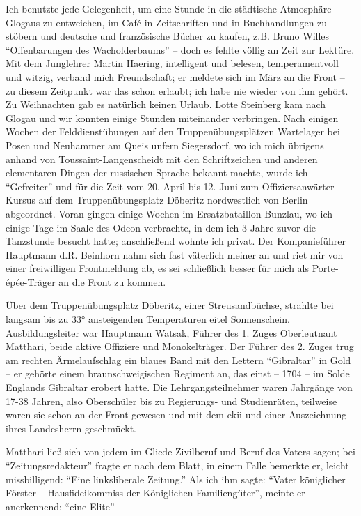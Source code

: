 \documentclass[a5paper,pagesize,10pt,twoside=true]{scrbook}
\begin{document}
Ich benutzte jede Gelegenheit, um eine Stunde in die städtische Atmosphäre Glogaus zu entweichen, im Café in Zeitschriften und in Buchhandlungen zu stöbern und deutsche und französische Bücher zu kaufen, z.B. Bruno Willes \enquote{Offenbarungen des Wacholderbaums} -- doch es fehlte völlig an Zeit zur Lektüre. Mit dem Junglehrer Martin Haering, intelligent und belesen, temperamentvoll und witzig, verband mich Freundschaft; er meldete sich im März an die Front -- zu diesem Zeitpunkt war das schon erlaubt; ich habe nie wieder von ihm gehört. Zu Weihnachten gab es natürlich keinen Urlaub. Lotte Steinberg kam nach Glogau und wir konnten einige Stunden miteinander verbringen. Nach einigen Wochen der Felddienstübungen auf den Truppenübungsplätzen Wartelager bei Posen und Neuhammer am Queis unfern Siegersdorf, wo ich mich übrigens anhand von Toussaint-Langenscheidt mit den Schriftzeichen und anderen elementaren Dingen der russischen Sprache bekannt machte, wurde ich \enquote{Gefreiter} und für die Zeit vom 20. April bis 12. Juni zum Offiziersanwärter-Kursus auf dem Truppenübungsplatz Döberitz nordwestlich von Berlin abgeordnet. Voran gingen einige Wochen im Ersatzbataillon Bunzlau, wo ich einige Tage im Saale des Odeon verbrachte, in dem ich 3 Jahre zuvor die -- Tanzstunde besucht hatte; anschließend wohnte ich privat. Der Kompanieführer Hauptmann d.R. Beinhorn nahm sich fast väterlich meiner an und riet mir von einer freiwilligen Frontmeldung ab, es sei schließlich besser für mich als Porte-épée-Träger an die Front zu kommen.

Über dem Truppenübungsplatz Döberitz, einer Streusandbüchse, strahlte bei langsam bis zu 33° ansteigenden Temperaturen eitel Sonnenschein. Ausbildungsleiter war Hauptmann Watsak, Führer des 1. Zuges Oberleutnant Matthari, beide aktive Offiziere und Monokelträger. Der Führer des 2. Zuges trug am rechten Ärmelaufschlag ein blaues Band mit den Lettern \enquote{Gibraltar} in Gold -- er gehörte einem braunschweigischen Regiment an, das einst -- 1704 -- im Solde Englands Gibraltar erobert hatte. Die Lehrgangsteilnehmer waren Jahrgänge von 17-38 Jahren, also Oberschüler bis zu Regierungs- und Studienräten, teilweise waren sie schon an der Front gewesen und mit dem \ac{ekii} und einer Auszeichnung ihres Landesherrn geschmückt.

Matthari ließ sich von jedem im Gliede Zivilberuf und Beruf des Vaters sagen; bei \enquote{Zeitungsredakteur} fragte er nach dem Blatt, in einem Falle bemerkte er, leicht missbilligend: \enquote{Eine linksliberale Zeitung.} Als ich ihm sagte: \enquote{Vater königlicher Förster -- Hausfideikommiss der Königlichen Familiengüter}, meinte er anerkennend: \enquote{eine Elite}
\end{document}
